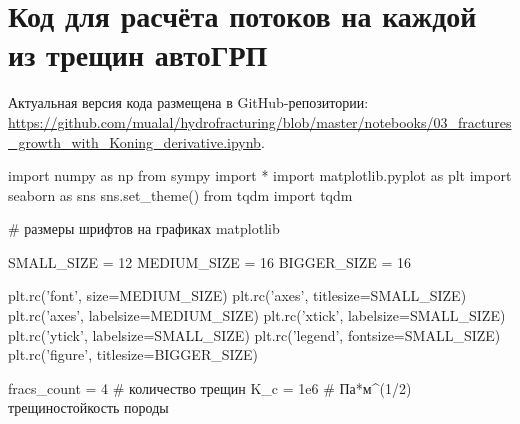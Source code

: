 \chapter{Код для расчёта потоков на каждой из трещин автоГРП}\label{appendix-rates-at-fractures}
\vspace*{-10mm}

Актуальная версия кода размещена в GitHub-репозитории: \url{https://github.com/mualal/hydrofracturing/blob/master/notebooks/03_fractures_growth_with_Koning_derivative.ipynb}.

\begin{pythoncode}
import numpy as np
from sympy import *
import matplotlib.pyplot as plt
import seaborn as sns
sns.set_theme()
from tqdm import tqdm
\end{pythoncode}


\begin{pythoncode}
# размеры шрифтов на графиках matplotlib

SMALL_SIZE = 12
MEDIUM_SIZE = 16
BIGGER_SIZE = 16

plt.rc('font', size=MEDIUM_SIZE)
plt.rc('axes', titlesize=SMALL_SIZE)
plt.rc('axes', labelsize=MEDIUM_SIZE)
plt.rc('xtick', labelsize=SMALL_SIZE)
plt.rc('ytick', labelsize=SMALL_SIZE)
plt.rc('legend', fontsize=SMALL_SIZE)
plt.rc('figure', titlesize=BIGGER_SIZE)
\end{pythoncode}


\begin{pythoncode}
fracs_count = 4  # количество трещин
K_c = 1e6  # Па*м^(1/2) трещиностойкость породы
\end{pythoncode}


